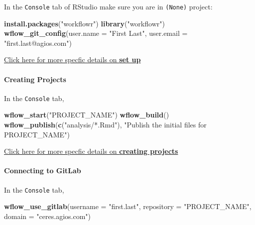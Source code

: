\documentclass[openany]{article}
\newenvironment{Shaded}{\begin{snugshade}}{\end{snugshade}}
\newcommand{\DataTypeTok}[1]{\textcolor[rgb]{0.13,0.29,0.53}{#1}}
\newcommand{\KeywordTok}[1]{\textcolor[rgb]{0.13,0.29,0.53}{\textbf{#1}}}
\newcommand{\NormalTok}[1]{#1}
\newcommand{\StringTok}[1]{\textcolor[rgb]{0.31,0.60,0.02}{#1}}
\let\oldparagraph\paragraph
\renewcommand{\paragraph}[1]{\oldparagraph{#1}\mbox{}}
\begin{document}
In the \texttt{Console} tab of RStudio make sure you are in \texttt{(None)} project:

\begin{Shaded}
\begin{Highlighting}[]
\KeywordTok{install.packages}\NormalTok{(}\StringTok{"workflowr"}\NormalTok{)}
\KeywordTok{library}\NormalTok{(}\StringTok{"workflowr"}\NormalTok{)}
\KeywordTok{wflow_git_config}\NormalTok{(}\DataTypeTok{user.name =} \StringTok{"First Last"}\NormalTok{, }\DataTypeTok{user.email =} \StringTok{"first.last@agios.com"}\NormalTok{)}
\end{Highlighting}
\end{Shaded}

\protect\hyperlink{installation}{Click here for more specfic details on \textbf{set up}}

\hypertarget{creating-projects}{%
\paragraph{Creating Projects}\label{creating-projects}}

In the \texttt{Console} tab,

\begin{Shaded}
\begin{Highlighting}[]
\KeywordTok{wflow_start}\NormalTok{(}\StringTok{"PROJECT_NAME"}\NormalTok{)}
\KeywordTok{wflow_build}\NormalTok{()}
\KeywordTok{wflow_publish}\NormalTok{(}\KeywordTok{c}\NormalTok{(}\StringTok{"analysis/*.Rmd"}\NormalTok{), }\StringTok{"Publish the initial files for PROJECT_NAME"}\NormalTok{)}
\end{Highlighting}
\end{Shaded}

\protect\hyperlink{create-project}{Click here for more specfic details on \textbf{creating projects}}

\hypertarget{connecting-to-gitlab}{%
\paragraph{Connecting to GitLab}\label{connecting-to-gitlab}}

In the \texttt{Console} tab,

\begin{Shaded}
\begin{Highlighting}[]
\KeywordTok{wflow_use_gitlab}\NormalTok{(}\DataTypeTok{username =} \StringTok{"first.last"}\NormalTok{, }\DataTypeTok{repository =} \StringTok{"PROJECT_NAME"}\NormalTok{, }\DataTypeTok{domain =} \StringTok{"ceres.agios.com"}\NormalTok{)}
\end{Highlighting}
\end{Shaded}
\end{document}
